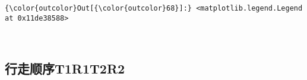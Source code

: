 \documentclass[11pt]{article}
\begin{document}
\begin{Verbatim}[commandchars=\\\{\}]
{\color{outcolor}Out[{\color{outcolor}68}]:} <matplotlib.legend.Legend at 0x11de38588>
\end{Verbatim}
            
    \begin{center}
    \end{center}
    { \hspace*{\fill} \\}
    
    \subsection{行走顺序T1R1T2R2}\label{ux884cux8d70ux987aux5e8ft1r1t2r2}
\end{document}
